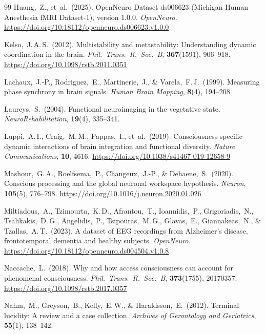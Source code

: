\documentclass[11pt,a4paper]{article}
\theoremstyle{plain}
\theoremstyle{definition}
\theoremstyle{remark}
\begin{document}
\begin{thebibliography}{99}
Huang,~Z., et~al.\ (2025).
OpenNeuro Dataset ds006623 (Michigan Human Anesthesia fMRI Dataset-1), version 1.0.0.
\textit{OpenNeuro}.
\url{https://doi.org/10.18112/openneuro.ds006623.v1.0.0}

Kelso,~J.\,A.\,S.\ (2012).
Multistability and metastability: Understanding dynamic coordination in the brain.
\textit{Phil.\ Trans.\ R.\ Soc.\ B}, \textbf{367}(1591), 906--918.
\url{https://doi.org/10.1098/rstb.2011.0351}

Lachaux,~J.-P., Rodriguez,~E., Martinerie,~J., \& Varela,~F.\,J.\ (1999).
Measuring phase synchrony in brain signals.
\textit{Human Brain Mapping}, \textbf{8}(4), 194--208.

Laureys,~S.\ (2004).
Functional neuroimaging in the vegetative state.
\textit{NeuroRehabilitation}, \textbf{19}(4), 335--341.

Luppi,~A.\,I., Craig,~M.\,M., Pappas,~I., et~al.\ (2019).
Consciousness-specific dynamic interactions of brain integration and functional diversity.
\textit{Nature Communications}, \textbf{10}, 4616.
\url{https://doi.org/10.1038/s41467-019-12658-9}

Mashour,~G.\,A., Roelfsema,~P., Changeux,~J.-P., \& Dehaene,~S.\ (2020).
Conscious processing and the global neuronal workspace hypothesis.
\textit{Neuron}, \textbf{105}(5), 776--798.
\url{https://doi.org/10.1016/j.neuron.2020.01.026}

Miltiadous,~A., Tzimourta,~K.\,D., Afrantou,~T., Ioannidis,~P., Grigoriadis,~N., Tsalikakis,~D.\,G., Angelidis,~P., Tsipouras,~M.\,G., Glavas,~E., Giannakeas,~N., \& Tzallas,~A.\,T.\ (2023).
A dataset of EEG recordings from Alzheimer's disease, frontotemporal dementia and healthy subjects.
\textit{OpenNeuro}.
\url{https://doi.org/10.18112/openneuro.ds004504.v1.0.8}

Naccache,~L.\ (2018).
Why and how access consciousness can account for phenomenal consciousness.
\textit{Phil.\ Trans.\ R.\ Soc.\ B}, \textbf{373}(1755), 20170357.
\url{https://doi.org/10.1098/rstb.2017.0357}

Nahm,~M., Greyson,~B., Kelly,~E.\,W., \& Haraldsson,~E.\ (2012).
Terminal lucidity: A review and a case collection.
\textit{Archives of Gerontology and Geriatrics}, \textbf{55}(1), 138--142.


\end{thebibliography}
\end{document}
